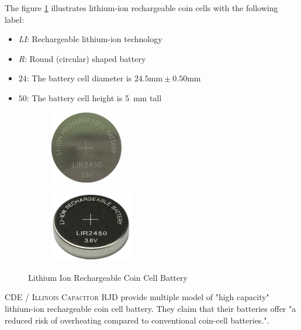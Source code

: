 \documentclass[report.tex]{subfiles}
\begin{document}
The figure \ref{fig:LIR2450} illustrates lithium-ion rechargeable coin cells with the following label:
\begin{itemize}
\item \textit{LI}: Rechargeable lithium-ion technology
\item \textit{R}: Round (circular) shaped battery
\item $24$: The battery cell diameter is $24.5\si{\milli\meter} \pm 0.50 \si{\milli\meter}$
\item $50$: The battery cell height is \SI{5}{\milli\meter} tall
\end{itemize}

\begin{figure}[H]
\centering
\begin{subfigure}{.4\textwidth}
	\centering
	\includegraphics[width=0.35\textwidth]{Include/Figure/Hardware/LIR2450.png}
\end{subfigure}
\begin{subfigure}{.4\textwidth}
	\centering
	\includegraphics[width=0.4\textwidth]{Include/Figure/Hardware/LIR2450_2.png}
\end{subfigure}
	\caption{Lithium Ion Rechargeable Coin Cell Battery\cite{LIR2450}}
	\label{fig:LIR2450}
\end{figure}


\textsc{CDE} / \textsc{Illinois Capacitor RJD} provide multiple model of "high capacity" lithium-ion rechargeable coin cell battery. They claim that their batteries offer "a reduced risk of overheating compared to conventional coin-cell batteries."\cite{LIR2450}.\\
\end{document}
